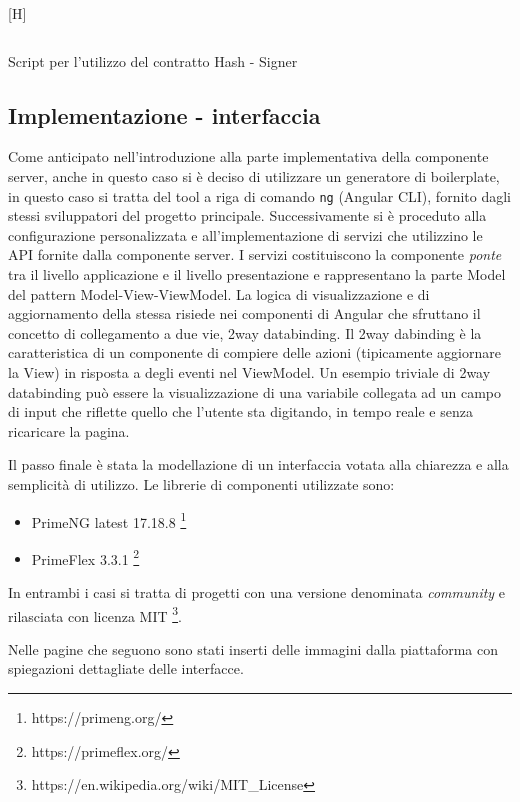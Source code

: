 \documentclass[a4paper,11pt]{article}
\newenvironment{longlisting}{\captionsetup{type=figure,labelformat=custom}}{}
\begin{document}
\begin{longlisting}[H]
  \inputminted{typescript}{./code/hash.sign.ts}
  \caption{Script per l'utilizzo del contratto Hash - Signer}
  \label{listing:hash6}
\end{longlisting}


\subsection{Implementazione - interfaccia}

Come anticipato nell'introduzione alla parte implementativa della componente server, anche in questo caso si è deciso di utilizzare un generatore di boilerplate, in questo caso si tratta del tool a riga di comando \texttt{ng} (Angular CLI), fornito dagli stessi sviluppatori del progetto principale. Successivamente si è proceduto alla configurazione personalizzata e all'implementazione di servizi che utilizzino le API fornite dalla componente server. I servizi costituiscono la componente \textit{ponte} tra il livello applicazione e il livello presentazione e rappresentano la parte Model del pattern Model-View-ViewModel. La logica di visualizzazione e di aggiornamento della stessa risiede nei componenti di Angular che sfruttano il concetto di collegamento a due vie, 2way databinding. Il 2way dabinding è la caratteristica di un componente di compiere delle azioni (tipicamente aggiornare la View) in risposta a degli eventi nel ViewModel. Un esempio triviale di 2way databinding può essere la visualizzazione di una variabile collegata ad un campo di input che riflette quello che l'utente sta digitando, in tempo reale e senza ricaricare la pagina.

Il passo finale è stata la modellazione di un interfaccia votata alla chiarezza e alla semplicità di utilizzo. Le librerie di componenti utilizzate sono:

\begin{itemize}
    \item PrimeNG latest 17.18.8 \footnote{https://primeng.org/}
    \item PrimeFlex 3.3.1 \footnote{https://primeflex.org/}
\end{itemize}

In entrambi i casi si tratta di progetti con una versione denominata \textit{community} e rilasciata con licenza MIT \footnote{https://en.wikipedia.org/wiki/MIT\_License}.

Nelle pagine che seguono sono stati inserti delle immagini dalla piattaforma con spiegazioni dettagliate delle interfacce.
\end{document}

